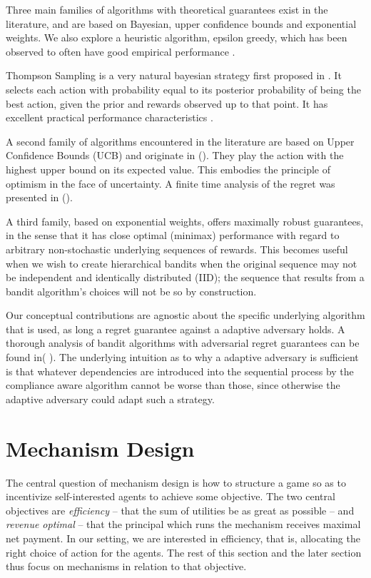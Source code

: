 Three main families of algorithms with theoretical guarantees exist in the literature, and are based on Bayesian, upper confidence bounds and exponential weights. We also explore a  heuristic algorithm, epsilon greedy, which has been observed to often have good empirical performance \cite{kuleshov:14}.

Thompson Sampling is a very natural bayesian strategy first proposed in \cite{thompson:33}. It selects each action with probability equal to its posterior probability of being the best action, given the prior and rewards observed up to that point. It has excellent practical performance characteristics \cite{chapelle2011empirical}. 

A second family of algorithms encountered in the literature are based on Upper Confidence Bounds (UCB) and originate in (\cite{lai:85,katehakis1995sequential,agrawal1995sample}). They play the action with the highest upper bound on its expected value. This embodies the principle of optimism in the face of uncertainty. A finite time analysis of the regret was presented in (\cite{auer:02a}).

A third family, based on exponential weights, offers maximally robust guarantees, in the sense that it has close optimal (minimax) performance with regard to arbitrary non-stochastic underlying sequences of rewards. This becomes useful when we wish to create hierarchical bandits when the original sequence may not be independent and identically distributed (IID); the sequence that results from a bandit algorithm's choices will not be so by construction.

 Our conceptual contributions are agnostic about the specific underlying algorithm that is used, as long a regret guarantee against a adaptive adversary holds. A thorough analysis of bandit algorithms with adversarial regret guarantees can be found in( \cite{bubeck:12, banditalgo2016}). The underlying intuition as to why a adaptive adversary is sufficient is that whatever dependencies are introduced into the sequential process by the compliance aware algorithm cannot be worse than those, since otherwise the adaptive adversary could adapt such a strategy.
 


\section{Mechanism Design}

The central question of mechanism design is how to structure a game so as to incentivize self-interested agents to achieve some objective.
The two central objectives are \emph{efficiency} -- that the sum of utilities be as great as possible -- and \emph{revenue optimal} -- that the principal which runs the mechanism receives maximal net payment.
In our setting, we are interested in efficiency, that is, allocating the right choice of action for the agents. The rest of this section and the later section thus focus on mechanisms in relation to that objective.

